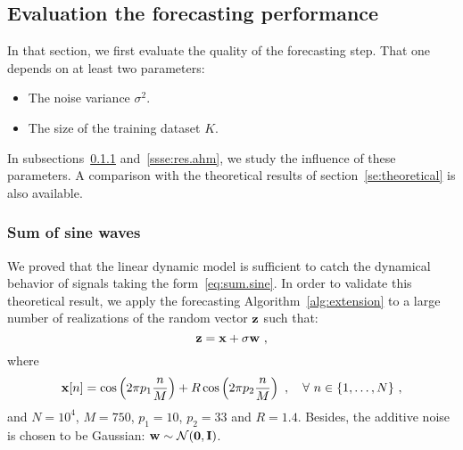\subsection{Evaluation the forecasting performance}
In that section, we first evaluate the quality of the forecasting step. That one depends on at least two parameters:
\begin{itemize}
\item The noise variance $\sigma^2$.
\item The size of the training dataset $K$. 
\end{itemize}
In subsections~\ref{ssse:res.sine} and~\ref{ssse:res.ahm}, we study the influence of these parameters. A comparison with the theoretical results of section~\ref{se:theoretical} is also available.

\subsubsection{Sum of sine waves}
\label{ssse:res.sine}
We proved that the linear dynamic model is sufficient to catch the dynamical behavior of signals taking the form~\eqref{eq:sum.sine}. In order to validate this theoretical result, we apply the forecasting Algorithm~\ref{alg:extension} to a large number of realizations of the random vector ${\mathbf z}$ such that:
\[
{\mathbf z} = {\mathbf x}+ \sigma{\mathbf w}\ ,
\]
where
\[
\bx[n] =\cos\left(2\pi p_1 \dfrac{n}{M} \right) + R\cos\left(2\pi p_2 \dfrac{n}{M} \right)\ ,\quad\forall\ n\in\{1,\ldots,N\}\ ,
\]
and $N=10^4$, $M=750$, $p_1=10$, $p_2=33$ and $R=1.4$. Besides, the additive noise is chosen to be Gaussian: ${\mathbf w}\sim{\mathcal N}(\boldsymbol{0},{\mathbf I})$.

